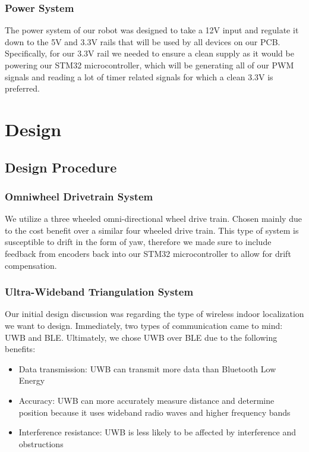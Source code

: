 \documentclass{report}
\begin{document}
    \subsection{Power System}
    The power system of our robot was designed to take a 12V input and regulate it down to the 5V and 3.3V rails that will be used by all devices on our PCB. Specifically, for our 3.3V rail we needed to ensure a clean supply as it would be powering our STM32 microcontroller, which will be generating all of our PWM signals and reading a lot of timer related signals for which a clean 3.3V is preferred.


    \chapter{Design}
    \section{Design Procedure}

    \subsection{Omniwheel Drivetrain System}
    \label{sec:Omniwheel-DesignProcedure}

    We utilize a three wheeled omni-directional wheel drive train. Chosen mainly due to the cost benefit over a similar four wheeled drive train. This type of system is susceptible to drift in the form of yaw, therefore we made sure to include feedback from encoders back into our STM32 microcontroller to allow for drift compensation.

    \subsection{Ultra-Wideband Triangulation System}
    Our initial design discussion was regarding the type of wireless indoor localization we want to design. Immediately, two types of communication came to mind: UWB and BLE. Ultimately, we chose UWB over BLE due to the following benefits:

    \begin{itemize}
      \item Data transmission: UWB can transmit more data than Bluetooth Low Energy
      \item Accuracy: UWB can more accurately measure distance and determine position because it uses wideband radio waves and higher frequency bands
      \item Interference resistance: UWB is less likely to be affected by interference and obstructions
    \end{itemize}
\end{document}
